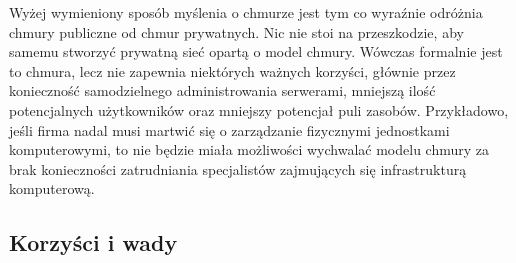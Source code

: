 \documentclass[12pt,a4paper,twoside,titlepage,openright]{book}
\begin{document}
Wyżej wymieniony sposób myślenia o chmurze jest tym co wyraźnie odróżnia chmury publiczne od chmur prywatnych. Nic nie stoi na przeszkodzie, aby samemu stworzyć prywatną sieć opartą o model chmury. Wówczas formalnie jest to chmura, lecz nie zapewnia niektórych ważnych korzyści, głównie przez konieczność samodzielnego administrowania serwerami, mniejszą ilość potencjalnych użytkowników oraz mniejszy potencjał puli zasobów. Przykładowo, jeśli firma nadal musi martwić się o zarządzanie fizycznymi jednostkami komputerowymi, to nie będzie miała możliwości wychwalać modelu chmury za brak konieczności zatrudniania specjalistów zajmujących się infrastrukturą komputerową.

\subsection*{Korzyści i wady}
\end{document}

